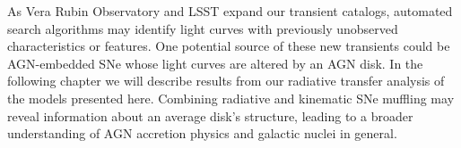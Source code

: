 As Vera Rubin Observatory and LSST expand our transient catalogs, automated search algorithms may identify light curves with previously unobserved characteristics or features.
One potential source of these new transients could be AGN-embedded SNe whose light curves are altered by an AGN disk.
In the following chapter we will describe results from our radiative transfer analysis of the models presented here.
Combining radiative and kinematic SNe muffling may reveal information about an average disk's structure, leading to a broader understanding of AGN accretion physics and galactic nuclei in general.






% 
